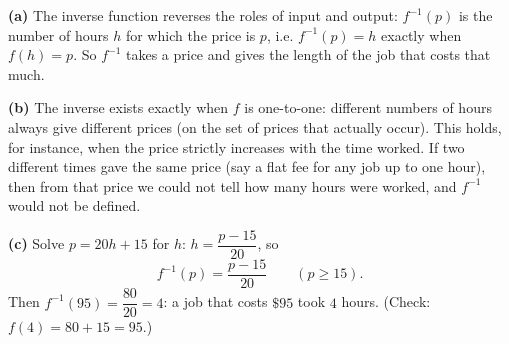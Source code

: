 \textbf{(a)} The inverse function reverses the roles of input and output: $f^{-1}(p)$ is the number of hours $h$ for which the price is $p$, i.e. $f^{-1}(p)=h$ exactly when $f(h)=p$. So $f^{-1}$ takes a price and gives the length of the job that costs that much.

\textbf{(b)} The inverse exists exactly when $f$ is one-to-one: different numbers of hours always give different prices (on the set of prices that actually occur). This holds, for instance, when the price strictly increases with the time worked. If two different times gave the same price (say a flat fee for any job up to one hour), then from that price we could not tell how many hours were worked, and $f^{-1}$ would not be defined.

\textbf{(c)} Solve $p=20h+15$ for $h$: $h=\dfrac{p-15}{20}$, so
\[f^{-1}(p)=\dfrac{p-15}{20}\qquad(p\ge15).\]
Then $f^{-1}(95)=\dfrac{80}{20}=\boxed{4}$: a job that costs $\$95$ took $4$ hours. (Check: $f(4)=80+15=95$.)
